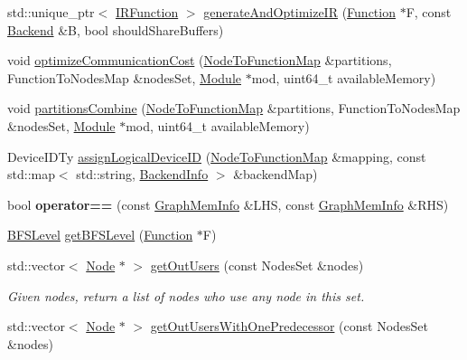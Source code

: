 \begin{DoxyCompactItemize}
std\+::unique\+\_\+ptr$<$ \hyperlink{classglow_1_1_i_r_function}{I\+R\+Function} $>$ \hyperlink{namespaceglow_a100064cb8d6d8c2aae54f4a114cf48f4}{generate\+And\+Optimize\+IR} (\hyperlink{classglow_1_1_function}{Function} $\ast$F, const \hyperlink{classglow_1_1_backend}{Backend} \&B, bool should\+Share\+Buffers)
\item 
void \hyperlink{namespaceglow_a07bee061556f83b0349d96ad196f0faf}{optimize\+Communication\+Cost} (\hyperlink{classglow_1_1_node_to_function_map}{Node\+To\+Function\+Map} \&partitions, Function\+To\+Nodes\+Map \&nodes\+Set, \hyperlink{classglow_1_1_module}{Module} $\ast$mod, uint64\+\_\+t available\+Memory)
\item 
void \hyperlink{namespaceglow_aab6afbd888776074c6bd9285aa3d9fd8}{partitions\+Combine} (\hyperlink{classglow_1_1_node_to_function_map}{Node\+To\+Function\+Map} \&partitions, Function\+To\+Nodes\+Map \&nodes\+Set, \hyperlink{classglow_1_1_module}{Module} $\ast$mod, uint64\+\_\+t available\+Memory)
\item 
Device\+I\+D\+Ty \hyperlink{namespaceglow_adce5a7edd1093d119dbed94a5dce5cdf}{assign\+Logical\+Device\+ID} (\hyperlink{classglow_1_1_node_to_function_map}{Node\+To\+Function\+Map} \&mapping, const std\+::map$<$ std\+::string, \hyperlink{structglow_1_1_backend_info}{Backend\+Info} $>$ \&backend\+Map)
\item 
\mbox{\label{namespaceglow_a6fba690abc1f8a3660e73f6e6c9959bd}} 
bool {\bfseries operator==} (const \hyperlink{structglow_1_1_graph_mem_info}{Graph\+Mem\+Info} \&L\+HS, const \hyperlink{structglow_1_1_graph_mem_info}{Graph\+Mem\+Info} \&R\+HS)
\item 
\hyperlink{namespaceglow_a03e8d2f34b0b5876fd4f7abaf0a0d73d}{B\+F\+S\+Level} \hyperlink{namespaceglow_acfa7d1d30cd1420a7a651fa3d63b33e6}{get\+B\+F\+S\+Level} (\hyperlink{classglow_1_1_function}{Function} $\ast$F)
\item 
std\+::vector$<$ \hyperlink{classglow_1_1_node}{Node} $\ast$ $>$ \hyperlink{namespaceglow_ace2ce9f3fea11d339cd0605fe8ece061}{get\+Out\+Users} (const Nodes\+Set \&nodes)
\begin{DoxyCompactList}\small\item\em Given {\ttfamily nodes}, return a list of nodes who use any node in this set. \end{DoxyCompactList}\item 
std\+::vector$<$ \hyperlink{classglow_1_1_node}{Node} $\ast$ $>$ \hyperlink{namespaceglow_a352ec64282f28b5487a23bf2d805a528}{get\+Out\+Users\+With\+One\+Predecessor} (const Nodes\+Set \&nodes)

\end{DoxyCompactItemize}
